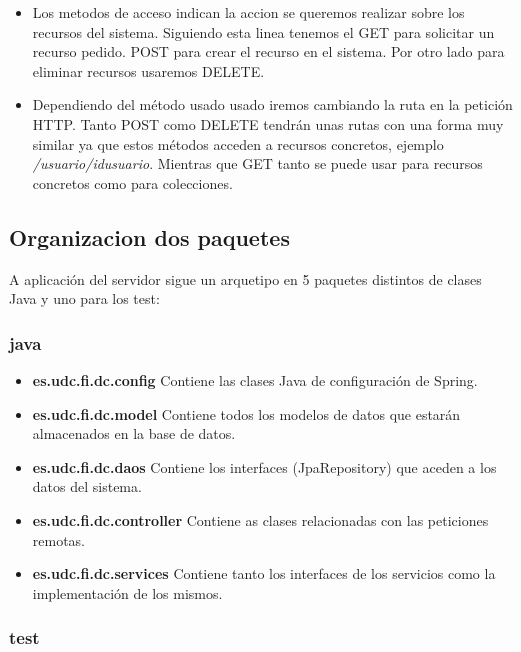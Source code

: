 \begin{itemize}
\item Los metodos de acceso indican la accion se queremos realizar sobre los recursos del sistema. Siguiendo esta linea tenemos el GET para solicitar un recurso pedido.  POST para crear el recurso en el sistema. Por otro lado para eliminar recursos usaremos DELETE. 



\item Dependiendo del método usado usado iremos cambiando la ruta en la petición HTTP. Tanto POST como DELETE tendrán unas rutas con una forma muy similar ya que estos métodos acceden a recursos concretos, ejemplo\textit{ /usuario/{idusuario}}. Mientras que GET tanto se puede usar para recursos concretos como para colecciones.



 


\end{itemize}

\subsection{Organizacion dos paquetes}
A aplicación del servidor sigue un arquetipo en 5 paquetes distintos de clases Java y uno para los test:
\subsubsection{java}
\begin{itemize}
\item\textbf{ es.udc.fi.dc.config} Contiene las clases Java de configuración de Spring.
\item \textbf{es.udc.fi.dc.model} Contiene todos los modelos de datos que estarán almacenados en la base de datos.
\item \textbf{es.udc.fi.dc.daos} Contiene los interfaces (JpaRepository) que aceden a los datos del sistema.
\item \textbf{es.udc.fi.dc.controller} Contiene as clases relacionadas  con las peticiones remotas.
\item  \textbf{es.udc.fi.dc.services} Contiene tanto los interfaces de los servicios como la implementación de los mismos.


\end{itemize}
\subsubsection{test}

